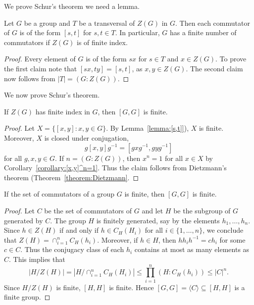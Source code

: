We prove Schur's theorem we need a lemma.

\begin{lemma}
	\label{lemma:[s,t]} 
	Let $G$ be a group and $T$ be a transversal of $Z(G)$ in
	$G$. Then each commutator of $G$ is of the form $[s,t]$ for $s,t\in T$. In particular, 
	$G$ has a finite number of commutators if $Z(G)$ is of finite index. 
\end{lemma}

\begin{proof}
	Every element of $G$ is of the form $sx$ for $s\in T$ and $x\in
	Z(G)$. To prove the first claim note that 
	$[sx,ty]=[s,t]$, 
	as $x,y\in Z(G)$. The second claim now follows from	$|T|=(G:Z(G))$.
\end{proof}

We now prove Schur's theorem. 

\begin{theorem}[Schur]
	\label{theorem:Schur_commutador}
	If $Z(G)$ has finite index in $G$, then $[G,G]$ is finite. 
\end{theorem}

\begin{proof}
	Let $X=\{[x,y]:x,y\in G\}$. By Lemma~\ref{lemma:[s,t]}), $X$ is finite.
	Moreover, $X$ is closed under conjugation, 
	\[
		g[x,y]g^{-1}=[gxg^{-1},gyg^{-1}]
	\]
	for all $g,x,y\in G$. If $n=(G:Z(G))$, then $x^n=1$ for all $x\in X$
	by Corollary~\ref{corollary:[x,y]^n=1}. Thus the claim follows from 
	Dietzmann's theorem (Theorem~\ref{theorem:Dietzmann}.
\end{proof}

\begin{corollary}[Sury]
	If the set of commutators of a group $G$ is finite, then 
	$[G,G]$ is finite.
\end{corollary}

\begin{proof}
	Let $C$ be the set of commutators of $G$ and let $H$ be the subgroup of $G$ 
	generated by $C$. The group $H$ is finitely generated, say by the elements 
	$h_1,\dots,h_n$. Since $h\in Z(H)$ if and only if $h\in C_H(H_i)$ for all 
	$i\in\{1,\dots,n\}$, we conclude that $Z(H)=\cap_{i=1}^n C_H(h_i)$. Moreover, if 
	$h\in H$, then $hh_ih^{-1}=ch_i$ for some $c\in C$. Thus the conjugacy class of each 
	$h_i$ contains at most as many elements as $C$. This implies that 
	\[
		|H/Z(H)|=|H/\cap_{i=1}^n C_H(H_i)|\leq\prod_{i=1}^n (H:C_H(h_i))\leq |C|^n.
	\]
	Since $H/Z(H)$ is finite, $[H,H]$ is finite. Hence  
	$[G,G]=\langle C\rangle\subseteq [H,H]$ 
	is a finite group.
\end{proof}

